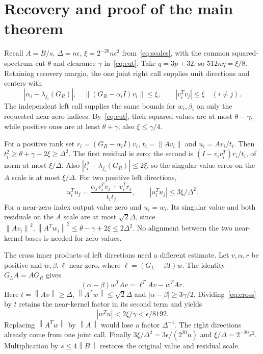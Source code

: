 \documentclass[11pt]{article}
\theoremstyle{remark}\newtheorem{remark}[theorem]{Remark}
\newcommand{\norm}[1]{\left\lVert#1\right\rVert}
\newcommand{\abs}[1]{\left\lvert#1\right\rvert}
\begin{document}
\section{Recovery and proof of the main theorem}\label{sec:recovery}
Recall $A=B/s$, $\Delta=n\epsilon$, $\xi=2^{-20}n\epsilon^3$
from~\eqref{eq:scales}, with the common squared-spectrum cut
$\theta$ and clearance $\gamma$ in~\eqref{eq:cut}.
Take $q=3p+32$, so $512n\eta=\xi/8$. Retaining recovery margin, the one
joint right call supplies unit directions and centers with
\[
 \abs{\alpha_i-\lambda_{j_i}(G_R)},\quad
 \norm{(G_R-\alpha_iI)v_i}\le\xi,\qquad
 \abs{v_i^Tv_j}\le\xi\quad(i\ne j).
\]
The independent left call supplies the same bounds for $w_i,\beta_i$ on
only the requested near-zero indices. By~\eqref{eq:cut}, their squared
values are at most $\theta-\gamma$, while positive ones are at least
$\theta+\gamma$; also $\xi\le\gamma/4$.

For a positive rank set $r_i=(G_R-\alpha_iI)v_i$,
$t_i=\norm{Av_i}$ and $u_i=Av_i/t_i$. Then
$t_i^2\ge\theta+\gamma-2\xi\ge\Delta^2$.
The first residual is zero; the second is
$(I-v_iv_i^T)r_i/t_i$, of norm at most $\xi/\Delta$.
Also $\abs{t_i^2-\lambda_{j_i}(G_R)}\le2\xi$, so the singular-value
error on the $A$ scale is at most $\xi/\Delta$.
For two positive left directions,
\[
 u_i^Tu_j=
 \frac{\alpha_jv_i^Tv_j+v_i^Tr_j}{t_it_j},\qquad
 \abs{u_i^Tu_j}\le3\xi/\Delta^2.
\]
For a near-zero index output value zero and $u_i=w_i$. Its singular value
and both residuals on the $A$ scale are at most $\sqrt2\Delta$, since
$\norm{Av_i}^2,\norm{A^Tw_i}^2\le\theta-\gamma+2\xi\le2\Delta^2$.
No alignment between the two near-kernel bases is needed for zero values.

The cross inner products of left directions need a different estimate.
Let $v,\alpha,r$ be positive and $w,\beta,\ell$ near zero, where
$\ell=(G_L-\beta I)w$. The identity $G_LA=AG_R$ gives
\begin{equation}\label{eq:cross}
 (\alpha-\beta)w^TAv=\ell^TAv-w^TAr.
\end{equation}
Here $t=\norm{Av}\ge\Delta$,
$\norm{A^Tw}\le\sqrt2\Delta$ and
$\abs{\alpha-\beta}\ge3\gamma/2$. Dividing~\eqref{eq:cross} by $t$
retains the near-kernel factor in its second term and yields
\[
 \abs{w^Tu}<2\xi/\gamma<\epsilon/8192.
\]
Replacing $\norm{A^Tw}$ by $\norm A$ would lose a factor $\Delta^{-1}$.
The right directions already come from one joint call. Finally
$3\xi/\Delta^2=3\epsilon/(2^{20}n)$ and
$\xi/\Delta=2^{-20}\epsilon^2$. Multiplication by $s\le4\norm B$
restores the original value and residual scale.
\end{document}
